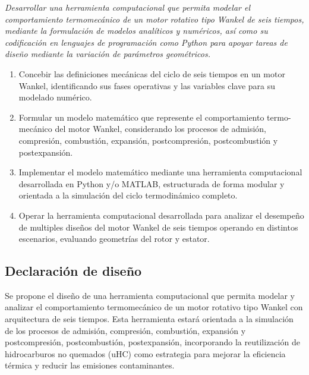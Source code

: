 \documentclass{LS}
\begin{document}
\textit{Desarrollar una herramienta computacional que permita modelar el comportamiento termomecánico de un motor rotativo tipo Wankel de seis tiempos, mediante la formulación de modelos analíticos y numéricos, así como su codificación en lenguajes de programación como Python para apoyar tareas de diseño mediante la variación de parámetros geométricos.}


\begin{enumerate}
    \setlength{\itemsep}{0pt}
    \setlength{\parskip}{0pt}
    
    \item Concebir las definiciones mecánicas del ciclo de seis tiempos en un motor Wankel, identificando sus fases operativas y las variables clave para su modelado numérico.

    \item Formular un modelo matemático que represente el comportamiento termo-mecánico del motor Wankel, considerando los procesos de admisión, compresión, combustión, expansión, postcompresión, postcombustión y postexpansión.

    \item Implementar el modelo matemático mediante una herramienta computacional desarrollada en Python y/o MATLAB, estructurada de forma modular y orientada a la simulación del ciclo termodinámico completo.

    \item Operar la herramienta computacional desarrollada para analizar el desempeño de multiples diseños del motor Wankel de seis tiempos operando en distintos escenarios, evaluando geometrías del rotor y estator.

    
\end{enumerate}

\subsection{Declaración de diseño}

Se propone el diseño de una herramienta computacional que permita modelar y analizar el comportamiento termomecánico de un motor rotativo tipo Wankel con arquitectura de seis tiempos. Esta herramienta estará orientada a la simulación de los procesos de admisión, compresión, combustión, expansión y postcompresión, postcombustión, postexpansión, incorporando la reutilización de hidrocarburos no quemados (uHC) como estrategia para mejorar la eficiencia térmica y reducir las emisiones contaminantes.
\end{document}
